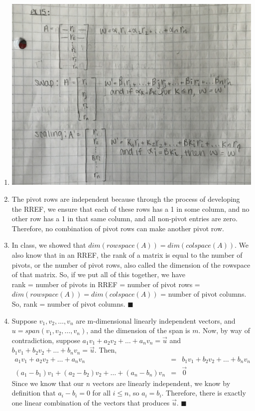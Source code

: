 \documentclass{article}
\newcommand*{\qed}{\hfill\ensuremath{\blacksquare}}
\begin{document}
\begin{enumerate}
\item 
\includegraphics[scale=0.1]{exercise15}

\item The pivot rows are independent because through the process of developing the RREF, we ensure that each of these rows has a 1 in some column, and no other row has a 1 in that same column, and all non-pivot entries are zero. Therefore, no combination of pivot rows can make another pivot row. 

\item In class, we showed that $dim(rowspace(A)) = dim(colspace(A))$. We also know that in an RREF, the rank of a matrix is equal to the number of pivots, or the number of pivot rows, also called the dimension of the rowspace of that matrix. So, if we put all of this together, we have \\
rank = number of pivots in RREF = number of pivot rows = $dim(rowspace(A)) = dim(colspace(A))$ = number of pivot columns. So, rank = number of pivot columns. \qed

\item Suppose $v_1, v_2, \dots, v_n$ are m-dimensional linearly independent vectors, and $u = span(v_1, v_2, \dots, v_n)$, and the dimension of the span is $m$. Now, by way of contradiction, suppose $a_1v_1 + a_2v_2 + \dots + a_nv_n = \overrightarrow{u}$ and $b_1v_1 + b_2v_2 + \dots + b_nv_n = \overrightarrow{u}$. Then, 
\begin{eqnarray*}
	a_1v_1 + a_2v_2 + \dots + a_nv_n &=& b_1v_1 + b_2v_2 + \dots + b_nv_n\\
	(a_1 - b_1)v_1 + (a_2 - b_2)v_2 + \dots + (a_n-b_n)v_n &=& \overrightarrow{0}
\end{eqnarray*}
Since we know that our $n$ vectors are linearly independent, we know by definition that $a_i - b_i = 0$ for all $i \leq n$, so $a_i = b_i$. Therefore, there is exactly one linear combination of the vectors that produces $\overrightarrow{u}$. \qed


\end{enumerate}
\end{document}
